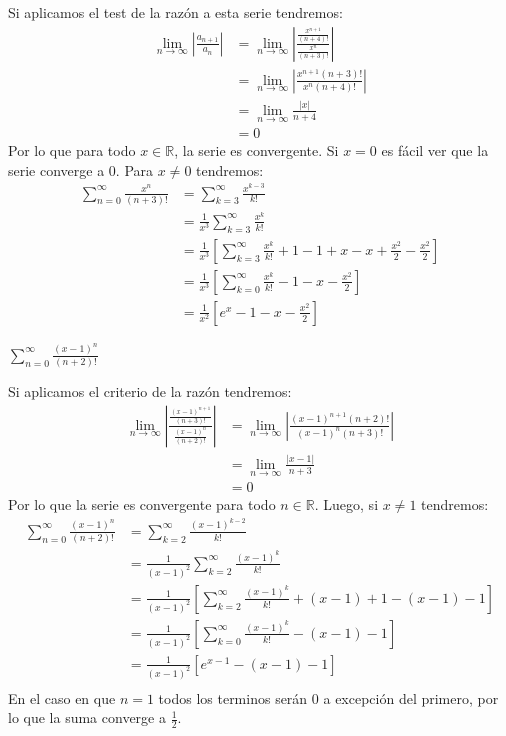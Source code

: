 \documentclass[../main.tex]{subfiles}
\begin{document}
Si aplicamos el test de la razón a esta serie tendremos:
\begin{align*}
    \lim_{n \to \infty} \left|\frac{a_{n+1}}{a_n}\right| &= \lim_{n \to \infty} \left|\frac{\frac{x^{n+1}}{(n+4)!}}{\frac{x^n}{(n+3)!}}\right|\\
    &= \lim_{n \to \infty} \left|\frac{x^{n+1} (n+3)!}{x^n (n+4)!}\right|\\
    &= \lim_{n \to \infty} \frac{|x|}{n+4}\\
    &= 0
\end{align*}
Por lo que para todo $x \in \mathbb{R}$, la serie es convergente. Si $x = 0$ es fácil ver que la serie converge a $0$. Para $x \neq 0$ tendremos:
\begin{align*}
    \sum_{n = 0}^\infty \frac{x^n}{(n+3)!} &= \sum_{k = 3}^\infty \frac{x^{k-3}}{k!}\\
    &= \frac{1}{x^3} \sum_{k = 3}^\infty \frac{x^k}{k!}\\
    &= \frac{1}{x^3} \left[\sum_{k = 3}^\infty \frac{x^k}{k!} + 1 - 1 + x - x + \frac{x^2}{2} - \frac{x^2}{2} \right]\\
    &= \frac{1}{x^3} \left[\sum_{k = 0}^\infty \frac{x^k}{k!} - 1 - x - \frac{x^2}{2} \right]\\
    &= \frac{1}{x^2} \left[e^x - 1 - x - \frac{x^2}{2}\right]
\end{align*}

\question $\sum\limits_{n = 0}^\infty \frac{(x-1)^n}{(n+2)!}$

Si aplicamos el criterio de la razón tendremos:
\begin{align*}
    \lim_{n \to \infty} \left|\frac{\frac{(x-1)^{n+1}}{(n+3)!}}{\frac{(x-1)^n}{(n+2)!}}\right| &= \lim_{n \to \infty} \left|\frac{(x-1)^{n+1} (n+2)!}{(x-1)^n (n+3)!}\right|\\
    &= \lim_{n \to \infty} \frac{|x-1|}{n+3}\\
    &= 0
\end{align*}
Por lo que la serie es convergente para todo $n \in \mathbb{R}$. Luego, si $x \neq 1$ tendremos:
\begin{align*}
    \sum\limits_{n = 0}^\infty \frac{(x-1)^n}{(n+2)!} &= \sum\limits_{k = 2}^\infty \frac{(x-1)^{k-2}}{k!}\\
    &= \frac{1}{(x-1)^2} \sum_{k = 2}^\infty \frac{(x-1)^k}{k!}\\
    &= \frac{1}{(x-1)^2}\left[\sum_{k = 2}^\infty \frac{(x-1)^k}{k!} + (x-1) + 1- (x-1) - 1 \right]\\ 
    &= \frac{1}{(x-1)^2}\left[\sum_{k = 0}^\infty \frac{(x-1)^k}{k!} - (x-1) - 1 \right]\\ 
    &= \frac{1}{(x-1)^2}\left[e^{x-1} - (x-1) - 1 \right]\\ 
\end{align*}
En el caso en que $n = 1$ todos los terminos serán $0$ a excepción del primero, por lo que la suma converge a $\frac{1}{2}$.
\end{document}

